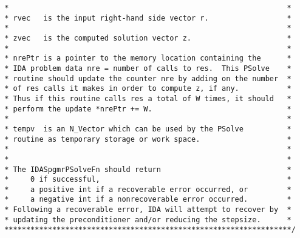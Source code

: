 \documentclass[11pt]{article}
\begin{document}
\begin{verbatim}
 *                                                                *
 * rvec   is the input right-hand side vector r.                  *
 *                                                                *
 * zvec   is the computed solution vector z.                      *
 *                                                                *
 * nrePtr is a pointer to the memory location containing the      *
 * IDA problem data nre = number of calls to res.  This PSolve    *
 * routine should update the counter nre by adding on the number  *
 * of res calls it makes in order to compute z, if any.           *
 * Thus if this routine calls res a total of W times, it should   *
 * perform the update *nrePtr += W.                               *
 *                                                                *
 * tempv  is an N_Vector which can be used by the PSolve          *
 * routine as temporary storage or work space.                    *
 *                                                                *
 *                                                                *
 * The IDASpgmrPSolveFn should return                             *
 *     0 if successful,                                           *
 *     a positive int if a recoverable error occurred, or         *
 *     a negative int if a nonrecoverable error occurred.         *
 * Following a recoverable error, IDA will attempt to recover by  *
 * updating the preconditioner and/or reducing the stepsize.      *
 ******************************************************************/

\end{verbatim}
\normalsize
\end{document}
